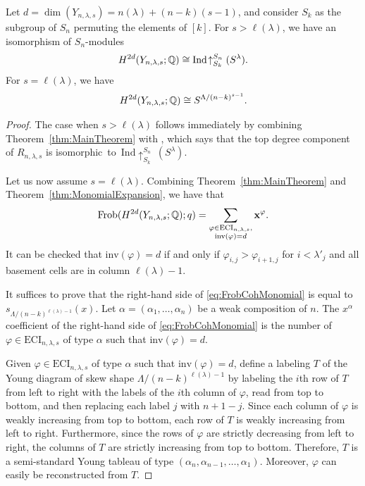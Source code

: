 \documentclass[12pt]{amsart}
\newcommand{\Frob}{\mathrm{Frob}}
\newcommand{\la}{\lambda}
\newcommand{\inv}{\mathrm{inv}}
\begin{document}
\begin{theorem}
Let $d = \dim(Y_{n,\la,s}) = n(\la) + (n-k)(s-1)$, and consider $S_k$ as the subgroup of $S_n$ permuting the elements of $[k]$. For $s>\ell(\la)$, we have an isomorphism of $S_n$-modules
\begin{align}
H^{2d}(Y_{n,\la,s};\bQ) \cong \mathrm{Ind}\!\uparrow_{S_k}^{S_n} (S^\la).
\end{align}
For $s=\ell(\la)$, we have
\begin{align}\label{eq:SLengthLambdaIso}
    H^{2d}(Y_{n,\la,s};\bQ) \cong S^{\Lambda/(n-k)^{s-1}}.
\end{align}
\end{theorem}

\begin{proof}
The case when $s>\ell(\lambda)$ follows immediately by combining Theorem~\ref{thm:MainTheorem} with \cite[Corollary 3.3.15]{GriffinThesis}, which says that the top degree component of $R_{n,\lambda,s}$ is isomorphic~to~$\mathrm{Ind}\!\uparrow_{S_k}^{S_n}~\!(S^\lambda)$.

Let us now assume $s=\ell(\lambda)$. Combining Theorem~\ref{thm:MainTheorem} and  Theorem~\ref{thm:MonomialExpansion}, we have that
\begin{align}\label{eq:FrobCohMonomial}
    \Frob(H^{2d}(Y_{n,\lambda,s};\bQ);q) = \sum_{\substack{\varphi \in \mathrm{ECI}_{n,\lambda,s},\\ \mathrm{inv}(\varphi)=d}} \mathbf{x}^\varphi.
\end{align}
It can be checked that $\inv(\varphi) = d$  if and only if $\varphi_{i,j} > \varphi_{i+1,j}$ for $i<\lambda'_j$ and all basement cells are in column $\ell(\lambda)-1$.

It suffices to prove that the right-hand side of \eqref{eq:FrobCohMonomial} is equal to $s_{\Lambda/(n-k)^{\ell(\la)-1}}(x)$. Let $\alpha = (\alpha_1,\dots, \alpha_n)$ be a weak composition of $n$.
The $x^\alpha$ coefficient of the right-hand side of \eqref{eq:FrobCohMonomial} is the number of $\varphi\in \mathrm{ECI}_{n,\la,s}$ of type $\alpha$ such that $\mathrm{inv}(\varphi) = d$. 

Given $\varphi\in \mathrm{ECI}_{n,\la,s}$ of type $\alpha$ such that $\mathrm{inv}(\varphi) = d$, define a labeling $T$ of the Young diagram of skew shape $\Lambda/(n-k)^{\ell(\lambda)-1}$ by labeling the $i$th row of $T$ from left to right with the labels of the $i$th column of $\varphi$, read from top to bottom, and then replacing each label $j$ with $n+1-j$. Since each column of $\varphi$ is weakly increasing from top to bottom, each row of $T$ is weakly increasing from left to right. Furthermore, since the rows of $\varphi$ are strictly decreasing from left to right, the columns of $T$ are strictly increasing from top to bottom. Therefore, $T$ is a semi-standard Young tableau of type $(\alpha_n,\alpha_{n-1},\dots, \alpha_1)$. Moreover, $\varphi$ can easily be reconstructed from $T$. 


\end{proof}
\end{document}
